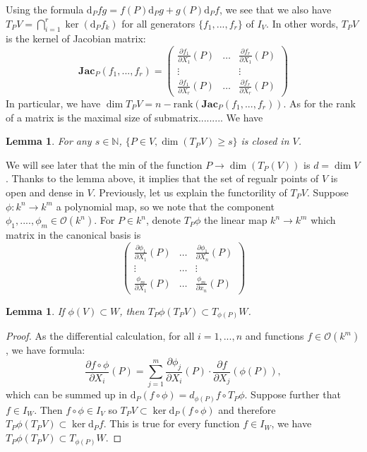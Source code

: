 \documentclass[12pt,a4paper,english]{article}
\theoremstyle{plain}
\newtheorem{lem}[thm]{Lemma}
\theoremstyle{definition}
\theoremstyle{remark}
\newcommand{\dif}{\text{d}}
\newcommand{\jac}{\textbf{Jac}}
\newcommand{\rank}{\text{rank}}
\begin{document}
Using the formula $\text{d}_{P}fg=f(P)\text{d}_{P}g+g(P)\text{d}_{P}f$, we see that we also have $T_{P}V=\bigcap^{r}_{i=1} \ker(\text{d}_{P}f_{k})$ for all generators $\{f_{1},...,f_{r}\}$ of $I_{V}$. In other words, $T_{P}V$ is the kernel of Jacobian matrix:
\begin{equation*}
    \jac_{P}(f_{1},...,f_{r})=
\begin{pmatrix}
\frac{\partial f_{1}}{\partial X_{1}}(P) & \dots & \frac{\partial f_{r}}{\partial X_{1}}(P)\\
\vdots & & \vdots\\
\frac{\partial f_{1}}{\partial X_{r}}(P) &\dots & \frac{\partial f_{r}}{\partial X_{r}}(P)
\end{pmatrix}
\end{equation*}
In particular, we have $\dim T_{P}V=n-\rank(\jac_{P}(f_{1},...,f_{r}))$. As for the rank of a matrix is the maximal size of submatrix......... We have 
\begin{lem}
For any $s\in\mathbb{N}$, $\{P\in V, \dim(T_{P}V)\geq s\}$ is closed in $V$. 
\end{lem}
We will see later that the min of the function $P\rightarrow \dim(T_{P}(V))$ is $d=\dim V$. Thanks to the lemma above, it implies that the set of regualr points of $V$ is open and dense in $V$. Previously, let us explain the functorility of $T_{P}V$. Suppose $\phi: k^{n}\rightarrow k^{m}$ a polynomial map, so we note that the component $\phi_{1},....,\phi_{m}\in \mathcal{O}(k^{n})$. For $P\in k^{n}$, denote $T_{P}\phi$ the linear map $k^{n}\rightarrow k^{m}$ which matrix in the canonical basis is 
\begin{equation*}
    \begin{pmatrix}
    \frac{\partial \phi_{1}}{\partial X_{1}}(P)&\dots& \frac{\partial \phi_{1}}{\partial X_{n}}(P)\\
    \vdots&\dots&\vdots\\
    \frac{\phi_{m}}{\partial X_{1}}(P)&\dots& \frac{\phi_{m}}{\partial x_{n}}(P)
    \end{pmatrix}
\end{equation*}
\begin{lem}
If $\phi(V)\subset W$, then $T_{P}\phi(T_{P}V)\subset T_{\phi(P)}W$.
\end{lem}
\begin{proof}
As the differential calculation, for all $i=1,...,n$ and functions $f\in\mathcal{O}(k^{m})$, we have formula:
\begin{equation*}
    \frac{\partial f\circ\phi}{\partial X_{i}}(P)=\sum^{m}_{j=1}\frac{\partial \phi_{j}}{\partial X_{i}}(P)\cdot\frac{\partial f}{\partial X
    _{j}}(\phi(P)),
\end{equation*}
which can be summed up in
$\dif_{P}(f\circ\phi)=d_{\phi(P)}f\circ T_{P}\phi$. Suppose further that $f\in I_{W}$. Then $f\circ \phi\in I_{V}$ so $T_{P}V\subset\ker \dif_{P}(f\circ\phi)$ and therefore $T_{P}\phi(T_{P}V)\subset \ker \dif_{P}f$. This is true for every function $f\in I_{W}$, we have $T_{P}\phi(T_{P}V)\subset T_{\phi(P)}W$.
\end{proof}
\end{document}
